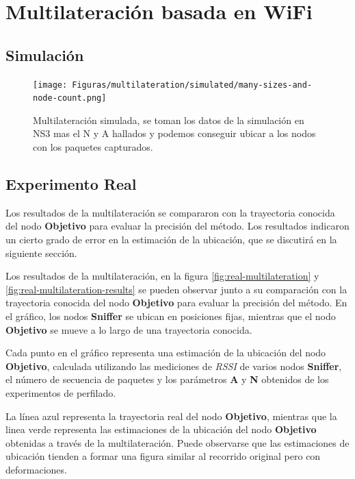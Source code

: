 \chapter{Multilateración basada en WiFi}




\section{Simulación}





\begin{figure}[!htb]
	\centering
	\texttt{[image: Figuras/multilateration/simulated/many-sizes-and-node-count.png]}
	\captionsetup{margin=2cm}
	\caption[Multilateración simulada]{Multilateración simulada, se toman los datos de la simulación en NS3 mas el N y A hallados y podemos conseguir ubicar a los nodos con los paquetes capturados.}
	\label{fig:infra-diagram}
\end{figure}

\section{Experimento Real}





Los resultados de la multilateración se compararon con la trayectoria conocida del nodo \textbf{Objetivo} para evaluar la precisión del método. Los resultados indicaron un cierto grado de error en la estimación de la ubicación, que se discutirá en la siguiente sección.


Los resultados de la multilateración, en la figura \ref{fig:real-multilateration} y \ref{fig:real-multilateration-results} se pueden observar junto a su comparación con la trayectoria conocida del nodo \textbf{Objetivo} para evaluar la precisión del método. En el gráfico, los nodos \textbf{Sniffer} se ubican en posiciones fijas, mientras que el nodo \textbf{Objetivo} se mueve a lo largo de una trayectoria conocida.

Cada punto en el gráfico representa una estimación de la ubicación del nodo \textbf{Objetivo}, calculada utilizando las mediciones de \textit{RSSI} de varios nodos \textbf{Sniffer}, el número de secuencia de paquetes y los parámetros \textbf{A} y \textbf{N} obtenidos de los experimentos de perfilado.

La línea azul representa la trayectoria real del nodo \textbf{Objetivo}, mientras que la linea verde representa las estimaciones de la ubicación del nodo \textbf{Objetivo} obtenidas a través de la multilateración. Puede observarse que las estimaciones de ubicación tienden a formar una figura similar al recorrido original pero con deformaciones.

